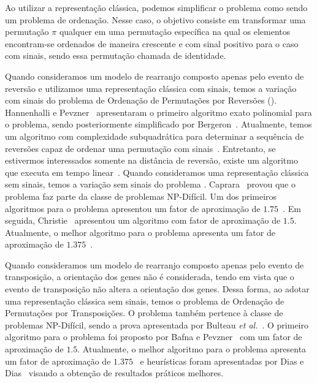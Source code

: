 Ao utilizar a representação clássica, podemos simplificar o problema como sendo um problema de ordenação. Nesse caso, o objetivo consiste em transformar uma permutação $\pi$ qualquer em uma permutação específica na qual os elementos encontram-se ordenados de maneira crescente e com sinal positivo para o caso com sinais, sendo essa permutação chamada de identidade.

Quando consideramos um modelo de rearranjo composto apenas pelo evento de reversão e utilizamos uma representação clássica com sinais, temos a variação com sinais do problema de Ordenação de Permutações por Reversões (\SbR). Hannenhalli e Pevzner~\cite{1999-hannenhalli-pevzner} apresentaram o primeiro algoritmo exato polinomial para o problema, sendo posteriormente simplificado por Bergeron~\cite{2005-bergeron}. Atualmente, temos um algoritmo com complexidade subquadrática para determinar a sequência de reversões capaz de ordenar uma permutação com sinais~\cite{2007-tannier-etal}. Entretanto, se estivermos interessados somente na distância de reversão, existe um algoritmo que executa em tempo linear~\cite{2001-bader-etal}. Quando consideramos uma representação clássica sem sinais, temos a variação sem sinais do problema \SbR. Caprara~\cite{1999-caprara} provou que o problema faz parte da classe de problemas NP-Difícil. Um dos primeiros algoritmos para o problema apresentou um fator de aproximação de $1.75$~\cite{1996-bafna-pevzner}. Em seguida, Christie~\cite{1998a-christie} apresentou um algoritmo com fator de aproximação de $1.5$. Atualmente, o melhor algoritmo para o problema apresenta um fator de aproximação de $1.375$~\cite{2002-berman-etal}.

Quando consideramos um modelo de rearranjo composto apenas pelo evento de transposição, a orientação dos genes não é considerada, tendo em vista que o evento de transposição não altera a orientação dos genes. Dessa forma, ao adotar uma representação clássica sem sinais, temos o problema de Ordenação de Permutações por Transposições. O problema também pertence à classe de problemas NP-Difícil, sendo a prova apresentada por Bulteau \textit{et al.}~\cite{2012-bulteau-etal}. O primeiro algoritmo para o problema foi proposto por Bafna e Pevzner~\cite{1998-bafna-pevzner} com um fator de aproximação de $1.5$. Atualmente, o melhor algoritmo para o problema apresenta um fator de aproximação de $1.375$~\cite{2006-elias-hartman,2022-silva-etal} e heurísticas foram apresentadas por Dias e Dias~\cite{2010c-dias-dias} visando a obtenção de resultados práticos melhores. 

